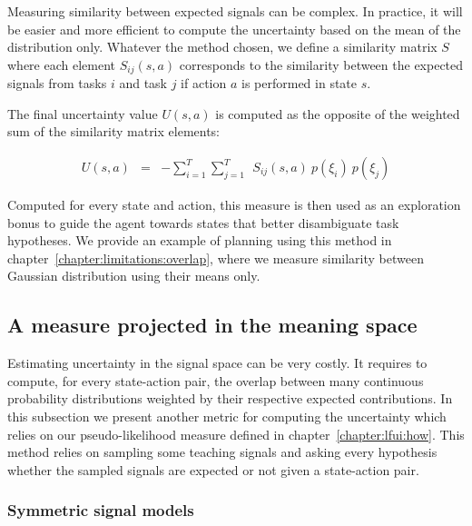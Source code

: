 Measuring similarity between expected signals can be complex. In practice, it will be easier and more efficient to compute the uncertainty based on the mean of the distribution only. Whatever the method chosen, we define a similarity matrix $S$ where each element $S_{ij}(s,a)$ corresponds to the similarity between the expected signals from tasks $i$ and task $j$ if action $a$ is performed in state $s$.


The final uncertainty value $U(s,a)$ is computed as the opposite of the weighted sum of the similarity matrix elements:

\begin{eqnarray}
U(s,a) &=& - \sum_{i = 1}^{T} \sum_{j = 1}^{T} ~~ S_{ij}(s,a) ~ p(\xi_i) ~ p(\xi_j)
\end{eqnarray}


Computed for every state and action, this measure is then used as an exploration bonus to guide the agent towards states that better disambiguate task hypotheses. We provide an example of planning using this method in chapter~\ref{chapter:limitations:overlap}, where we measure similarity between Gaussian distribution using their means only.

\subsection{A measure projected in the meaning space}
\label{chapter:planning:uncertiantyprojected}

Estimating uncertainty in the signal space can be very costly. It requires to compute, for every state-action pair, the overlap between many continuous probability distributions weighted by their respective expected contributions. In this subsection we present another metric for computing the uncertainty which relies on our pseudo-likelihood measure defined in chapter~\ref{chapter:lfui:how}. This method relies on sampling some teaching signals and asking every hypothesis whether the sampled signals are expected or not given a state-action pair.

\subsubsection*{Symmetric signal models}

